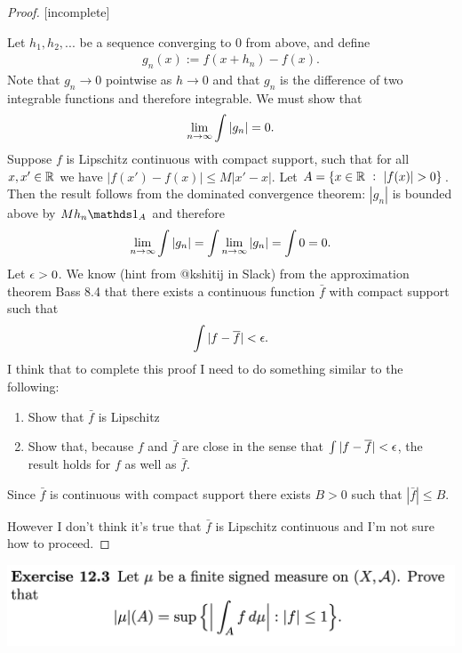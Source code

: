 \begin{proof}

  [incomplete]

  Let $h_1, h_2, ...$ be a sequence converging to $0$ from above, and define
  \begin{align*}
    g_n(x) := f(x + h_n) - f(x).
  \end{align*}
  Note that $g_n \to 0$ pointwise as $h \to 0$ and that $g_n$ is the difference of two integrable functions and
  therefore integrable. We must show that
  \begin{align*}
    \limninf \int |g_n| = 0.
  \end{align*}
  Suppose $f$ is Lipschitz continuous with compact support, such that for all $x, x' \in \mathbb{R}$ we
  have $|f(x') - f(x)| \leq M|x' - x|$. Let $A = \{x \in \mathbb{R} ~:~ |f(x)| > 0 \}$. Then the result follows from
  the dominated convergence theorem: $|g_n|$ is bounded above by $Mh_n\ind_A$ and therefore
  \begin{align*}
    \limninf \int |g_n| = \int \limninf |g_n| = \int 0 = 0.
  \end{align*}
  Let $\epsilon > 0$. We know (hint from @kshitij in Slack) from the approximation theorem Bass 8.4 that there
  exists a continuous function $\bar f$ with compact support such that
  \begin{align*}
    \int |f - \overline f| < \epsilon.
  \end{align*}
  I think that to complete this proof I need to do something similar to the following:
  \begin{enumerate}
  \item Show that $\bar f$ is Lipschitz
  \item Show that, because $f$ and $\bar f$ are close in the sense that $\int |f - \overline f| < \epsilon$, the result
    holds for $f$ as well as $\bar f$.
  \end{enumerate}
  Since $\bar f$ is continuous with compact support there exists $B > 0$ such that $|\bar f| \leq B$.

  However I don't think it's true that $\bar f$ is Lipschitz continuous and I'm not sure how to proceed.
\end{proof}




\newpage
\begin{mdframed}
\includegraphics[width=400pt]{img/analysis--berkeley-202a-hw10-551e.png}
\end{mdframed}

